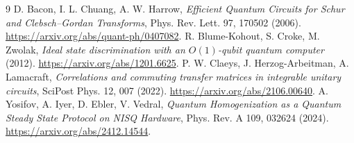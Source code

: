 \documentclass[11pt]{article}
\begin{document}
\begingroup
\footnotesize
\begin{thebibliography}{9}
\setlength{\itemsep}{1pt}
 D. Bacon, I. L. Chuang, A. W. Harrow,
\emph{Efficient Quantum Circuits for Schur and Clebsch--Gordan Transforms},
Phys. Rev. Lett. 97, 170502 (2006).
\url{https://arxiv.org/abs/quant-ph/0407082}.
 R. Blume-Kohout, S. Croke, M. Zwolak,
\emph{Ideal state discrimination with an $O(1)$-qubit quantum computer}
(2012). \url{https://arxiv.org/abs/1201.6625}.
 P. W. Claeys, J. Herzog-Arbeitman, A. Lamacraft,
\emph{Correlations and commuting transfer matrices in integrable unitary
circuits}, SciPost Phys. 12, 007 (2022).
\url{https://arxiv.org/abs/2106.00640}.
 A. Yosifov, A. Iyer, D. Ebler, V. Vedral,
\emph{Quantum Homogenization as a Quantum Steady State Protocol on NISQ
Hardware}, Phys. Rev. A 109, 032624 (2024).
\url{https://arxiv.org/abs/2412.14544}.
\end{thebibliography}
\endgroup
\end{document}
